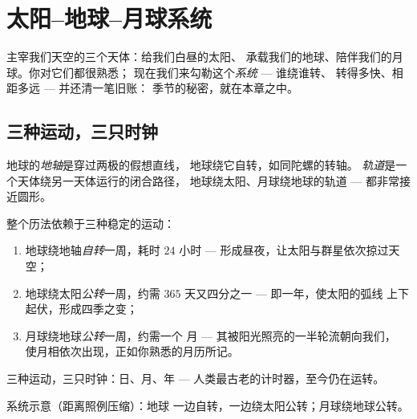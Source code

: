 \chapter{太阳--地球--月球系统}\label{ch:g6:sun-earth-moon}

主宰我们天空的三个天体：给我们白昼的太阳、
承载我们的地球、陪伴我们的月球。你对它们都很熟悉；
现在我们来勾勒这个\emph{系统} --- 谁绕谁转、
转得多快、相距多远 --- 并还清一笔旧账：
季节的秘密，就在本章之中。

\section{三种运动，三只时钟}

\begin{definition}[地轴与轨道]\label{def:g6:sun-earth-moon:axisorbit}
地球的\emph{地轴}是穿过两极的假想直线，
地球绕它自转，如同陀螺的转轴。
\emph{轨道}是一个天体绕另一天体运行的闭合路径，
地球绕太阳、月球绕地球的轨道 ---
都非常接近圆形。
\end{definition}

\begin{proposition}[三种运动]\label{prop:g6:sun-earth-moon:motions}
整个历法依赖于三种稳定的运动：
\begin{enumerate}
  \item 地球绕地轴\emph{自转}一周，耗时 $24$
        小时 --- 形成昼夜，让太阳与群星依次掠过天空；
  \item 地球绕太阳\emph{公转}一周，约需 $365$
        天又四分之一 --- 即一年，使太阳的弧线
        上下起伏，形成四季之变；
  \item 月球绕地球\emph{公转}一周，约需一个
        月 --- 其被阳光照亮的一半轮流朝向我们，
        使月相依次出现，正如你熟悉的月历所记。
\end{enumerate}
三种运动，三只时钟：日、月、年 ---
人类最古老的计时器，至今仍在运转。
\end{proposition}

\begin{omfigure}

{\small 系统示意（距离照例压缩）：地球
一边自转，一边绕太阳公转；月球绕地球公转。}
\end{omfigure}

